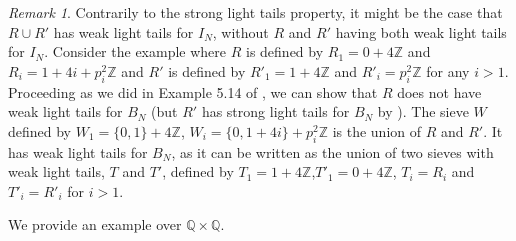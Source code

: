\documentclass[a4paper,11pt,reqno]{amsart}
\theoremstyle{plain}
\theoremstyle{remark}
\newtheorem{remark}[theorem]{Remark}
\newcommand{\q}{\mathbb{Q}}
\newcommand{\z}{\mathbb{Z}}
\begin{document}
			
			\begin{remark}
				Contrarily to the strong light tails property, it might be the case that $R\cup R'$ has weak light tails for $I_N$, without $R$ and $R'$ having both weak light tails for $I_N$. Consider the example where $R$ is defined by $R_1 = 0+4\z $ and $R_{i} = 1+4i +p_{i}^2\z$ and $R'$ is defined by $R'_1 = 1+ 4\z$ and $R'_i = p_i^2\z$ for any $i>1$. Proceeding as we did in Example 5.14 of \cite{part1}, we can show that $R$ does not have weak light tails for $B_N$ (but $R'$ has strong light tails for $B_N$ by  ). The sieve $W$ defined by $W_1 = \{0,1\}+4\z$,  $W_{i} = \{0,1+4i\} +p_{i}^2\z$ is the union of $R$ and $R'$. It has weak light tails for $B_N$, as it can be written as the union of two sieves with weak light tails, $T$ and $T'$, defined by $T_1 = 1+4\z$,$T'_1 = 0+4\z$, $T_i = R_i$  and $T'_i = R'_i$ for $i>1$. 
			\end{remark}
			
		
			
			We provide an example over $\q \times \q$.
			
\end{document}
